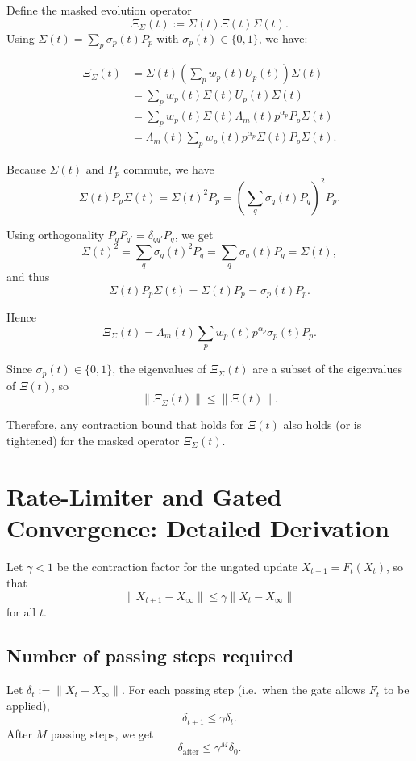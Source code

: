 \documentclass[11pt]{article}
\begin{document}
Define the masked evolution operator
\[
\Xi_\Sigma(t) := \Sigma(t) \Xi(t) \Sigma(t).
\]
Using $\Sigma(t) = \sum_p \sigma_p(t) P_p$ with $\sigma_p(t)\in\{0,1\}$, we have:

\begin{align*}
\Xi_\Sigma(t)
&= \Sigma(t) \left(\sum_p w_p(t) U_p(t)\right) \Sigma(t) \\
&= \sum_p w_p(t) \Sigma(t) U_p(t) \Sigma(t) \\
&= \sum_p w_p(t) \Sigma(t) \Lambda_m(t)p^{\alpha_p} P_p \Sigma(t) \\
&= \Lambda_m(t) \sum_p w_p(t) p^{\alpha_p} \Sigma(t) P_p \Sigma(t).
\end{align*}

Because $\Sigma(t)$ and $P_p$ commute, we have
\[
\Sigma(t) P_p \Sigma(t)
= \Sigma(t)^2 P_p
= \left(\sum_q \sigma_q(t)P_q\right)^2 P_p.
\]

Using orthogonality $P_q P_{q'} = \delta_{qq'}P_q$, we get
\[
\Sigma(t)^2 = \sum_q \sigma_q(t)^2 P_q
= \sum_q \sigma_q(t) P_q
= \Sigma(t),
\]
and thus
\[
\Sigma(t) P_p \Sigma(t)
= \Sigma(t) P_p
= \sigma_p(t) P_p.
\]

Hence
\[
\Xi_\Sigma(t) = \Lambda_m(t) \sum_p w_p(t) p^{\alpha_p} \sigma_p(t) P_p.
\]

Since $\sigma_p(t)\in\{0,1\}$, the eigenvalues of $\Xi_\Sigma(t)$ are a subset
of the eigenvalues of $\Xi(t)$, so
\[
\|\Xi_\Sigma(t)\| \le \|\Xi(t)\|.
\]

Therefore, any contraction bound that holds for $\Xi(t)$ also holds (or is
tightened) for the masked operator $\Xi_\Sigma(t)$.

\section{Rate-Limiter and Gated Convergence: Detailed Derivation}

Let $\gamma<1$ be the contraction factor for the ungated update
$X_{t+1} = F_t(X_t)$, so that
\[
\|X_{t+1} - X_\infty\| \le \gamma \|X_t - X_\infty\|
\]
for all $t$.

\subsection{Number of passing steps required}

Let $\delta_t := \|X_t - X_\infty\|$. For each passing step
(i.e.\ when the gate allows $F_t$ to be applied),
\[
\delta_{t+1} \le \gamma \delta_t.
\]
After $M$ passing steps, we get
\[
\delta_{\mathrm{after}} \le \gamma^M \delta_0.
\]
\end{document}
